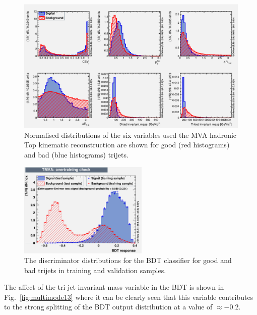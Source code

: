 \begin{figure}[ht!]
\centering
\includegraphics[width=\linewidth]{images/Run2/variables_id_c1.pdf}
\caption{Normalised distributions of the six variables used the MVA hadronic Top kinematic reconstruction are shown for good (red histograms) and bad (blue histograms) trijets.}
\label{fig:TrijetBDTInputFeatures13}
\end{figure}

\begin{figure}[ht!]
\begin{center}
    \includegraphics[width=0.55\textwidth]{images/Run2/overtrain_BDT.pdf}
    \caption{The discriminator distributions for the BDT classifier for good and bad trijets in training and validation samples.}
    \label{fig:TrijetBDTOutput13}
\end{center}
\end{figure}

The affect of the tri-jet invariant mass variable in the BDT is shown in Fig.~\ref{fig:multimode13} where it can be clearly seen that this variable contributes to the strong splitting of the BDT output distribution at a value of $\approx-0.2$.


